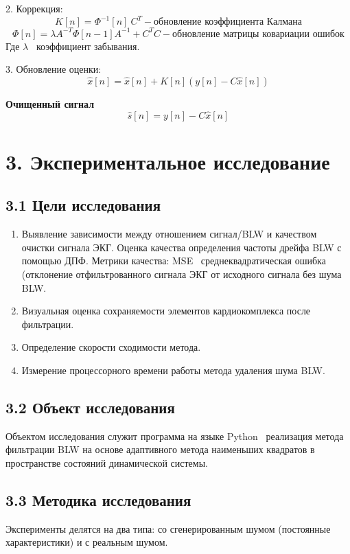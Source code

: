 \documentclass[10pt,a5paper]{article}
\numberwithin{figure}{section}
\numberwithin{table}{section}
\begin{document}
2. Коррекция:  
   \[
   K\left[n\right]=\Phi^{-1}\left[n\right]{\ C}^T - \text{обновление коэффициента Калмана}
   \]
   \[
   \Phi\left[n\right]=\lambda A^{-T}\Phi\left[n-1\right]A^{-1}+C^TC - \text{обновление матрицы ковариации ошибок}
   \]  
   Где $\lambda$ \textendash\ коэффициент забывания.

3. Обновление оценки:  
   \[
   \hat{x}\left[n\right]=\hat{x}\left[n\right]+K\left[n\right]\left(y\left[n\right]-C\hat{x}\left[n\right]\right)
   \]

\textbf{Очищенный сигнал}
   \[
   \hat{s}\left[n\right]=y\left[n\right]-C\hat{x}\left[n\right]
   \]

\section{3. Экспериментальное исследование}
\subsection{3.1 Цели исследования}
\begin{enumerate}
  \item Выявление зависимости между отношением сигнал/BLW и качеством очистки сигнала ЭКГ. Оценка качества определения частоты дрейфа BLW с помощью ДПФ. Метрики качества: MSE \textendash\ среднеквадратическая ошибка (отклонение отфильтрованного сигнала ЭКГ от исходного сигнала без шума BLW.
  \item Визуальная оценка сохраняемости элементов кардиокомплекса после фильтрации.
  \item Определение скорости сходимости метода.
  \item Измерение процессорного времени работы метода удаления шума BLW.
\end{enumerate}

\subsection{3.2 Объект исследования}
Объектом исследования служит программа на языке Python \textendash\ реализация метода
фильтрации BLW на основе адаптивного метода наименьших квадратов в пространстве состояний динамической системы.

\subsection{3.3 Методика исследования}
Эксперименты делятся на два типа: со сгенерированным шумом (постоянные характеристики) и с реальным шумом.
\end{document}
